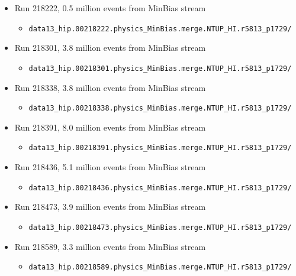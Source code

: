 \begin{itemize}
\item Run 218222, 0.5 million events from MinBias stream
\begin{itemize}[leftmargin=*]
\item[] \verb|data13_hip.00218222.physics_MinBias.merge.NTUP_HI.r5813_p1729/|
\end{itemize}

\item Run 218301, 3.8 million events from MinBias stream
\begin{itemize}[leftmargin=*]
\item[] \verb|data13_hip.00218301.physics_MinBias.merge.NTUP_HI.r5813_p1729/|
\end{itemize}

\item Run 218338, 3.8 million events from MinBias stream
\begin{itemize}[leftmargin=*]
\item[] \verb|data13_hip.00218338.physics_MinBias.merge.NTUP_HI.r5813_p1729/|
\end{itemize}

\item Run 218391, 8.0 million events from MinBias stream
\begin{itemize}[leftmargin=*]
\item[] \verb|data13_hip.00218391.physics_MinBias.merge.NTUP_HI.r5813_p1729/|
\end{itemize}

\item Run 218436, 5.1 million events from MinBias stream
\begin{itemize}[leftmargin=*]
\item[] \verb|data13_hip.00218436.physics_MinBias.merge.NTUP_HI.r5813_p1729/|
\end{itemize}

\item Run 218473, 3.9 million events from MinBias stream
\begin{itemize}[leftmargin=*]
\item[] \verb|data13_hip.00218473.physics_MinBias.merge.NTUP_HI.r5813_p1729/|
\end{itemize}

\item Run 218589, 3.3 million events from MinBias stream
\begin{itemize}[leftmargin=*]
\item[] \verb|data13_hip.00218589.physics_MinBias.merge.NTUP_HI.r5813_p1729/|
\end{itemize}


\end{itemize}

